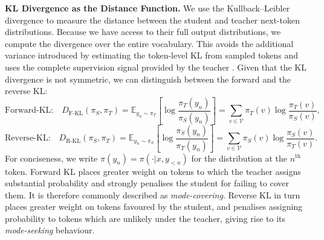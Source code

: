\documentclass{article} %
\theoremstyle{plain}
\theoremstyle{definition}
\theoremstyle{remark}
\begin{document}
\textbf{KL Divergence as the Distance Function.} We use the Kullback--Leibler divergence to measure the distance between the student and teacher next-token distributions. Because we have access to their full output distributions, we compute the divergence over the entire vocabulary. This avoids the additional variance introduced by estimating the token-level KL from sampled tokens and uses the complete supervision signal provided by the teacher \citep{deepseekai2026deepseekv4highlyefficientmilliontoken}.
Given that the KL divergence is not symmetric, we can distinguish between the forward and the reverse KL:
\begin{equation}
    \text{Forward-KL:} \quad D_{\text{F-KL}}(\pi_S, \pi_T) = \mathbb{E}_{y_n \sim \pi_T}\left[\log{\frac{\pi_T(y_n)}{\pi_S(y_n)}}\right] = \sum_{v \in \mathcal{V}} \pi_T(v) \log{\frac{\pi_T(v)}{\pi_S(v)}},
\end{equation}
\begin{equation}
    \text{Reverse-KL:} \quad D_{\text{R-KL}}(\pi_S, \pi_T) = \mathbb{E}_{y_n \sim \pi_S}\left[\log{\frac{\pi_S(y_n)}{\pi_T(y_n)}}\right] = \sum_{v \in \mathcal{V}} \pi_S(v) \log{\frac{\pi_S(v)}{\pi_T(v)}}.
\end{equation}
For conciseness, we write $\pi(y_n) = \pi(\cdot | x, y_{<n})$ for the distribution at the $n^{\text{th}}$ token. Forward KL places greater weight on tokens to which the teacher assigns substantial probability and strongly penalises the student for failing to cover them. It is therefore commonly described as \textit{mode-covering}. Reverse KL in turn places greater weight on tokens favoured by the student, and penalises assigning probability to tokens which are unlikely under the teacher, giving rise to its \textit{mode-seeking} behaviour.
\end{document}
